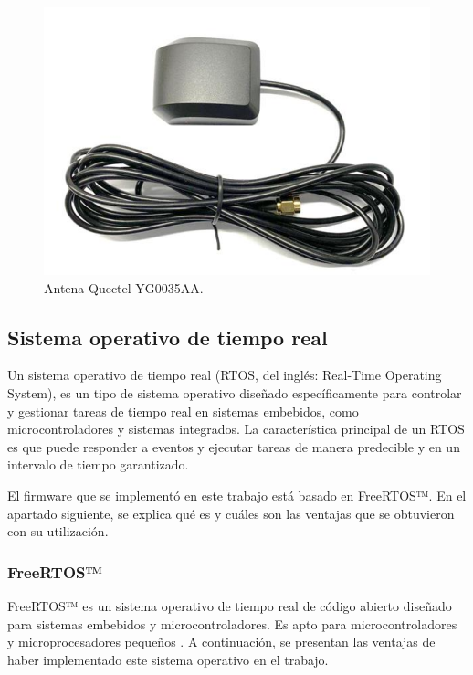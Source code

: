 \begin{figure}[htbp]
	\centering
	\includegraphics[width=.5\textwidth]{./Figures/Antena_Quectel_YG0035AA.png}
	\caption{Antena Quectel YG0035AA\protect\footnotemark.}
	\label{fig:Antena}
\end{figure}



\subsection{Sistema operativo de tiempo real}
\label{sec:RTOS}

Un sistema operativo de tiempo real (RTOS, del inglés: Real-Time Operating System), es un tipo de sistema operativo diseñado específicamente para controlar y gestionar tareas de tiempo real en sistemas embebidos, como microcontroladores y sistemas integrados. La característica principal de un RTOS es que puede responder a eventos y ejecutar tareas de manera predecible y en un intervalo de tiempo garantizado.

El firmware que se implementó en este trabajo está basado en FreeRTOS™. En el apartado siguiente, se explica qué es y cuáles son las ventajas que se obtuvieron con su utilización. 

\subsubsection{FreeRTOS™}
\label{sec:FreeRTOS}

FreeRTOS™ es un sistema operativo de tiempo real de código abierto diseñado para sistemas embebidos y microcontroladores. Es apto para microcontroladores y microprocesadores pequeños \citep{FreeRTOS}. A continuación, se presentan las ventajas de haber implementado este sistema operativo en el trabajo.

